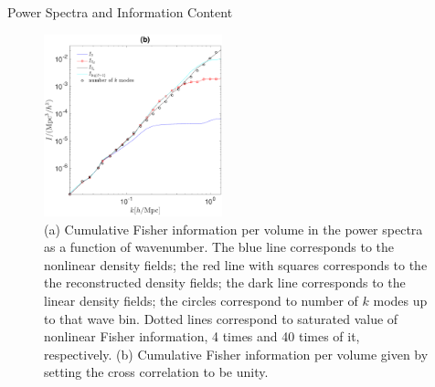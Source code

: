 \begin{section}{Power Spectra and Information Content}
\begin{figure}
  \includegraphics[width=0.46\textwidth]{fisher_best_analysis-crop.pdf}
\centering
   \caption{(a) Cumulative Fisher information per volume in the power spectra 
as a function of wavenumber. The blue line corresponds to the nonlinear density fields; 
the red line with squares corresponds to the the reconstructed density fields; 
the dark line corresponds to the linear density fields; the circles correspond to number 
of $k$ modes up to that wave bin. Dotted lines correspond to saturated value of 
nonlinear Fisher information, 4 times and 40 times of it, respectively. (b) Cumulative Fisher information 
per volume given by setting the cross correlation to be unity.}
  \label{fig:fisherinfo}

\end{figure}

\end{section}
